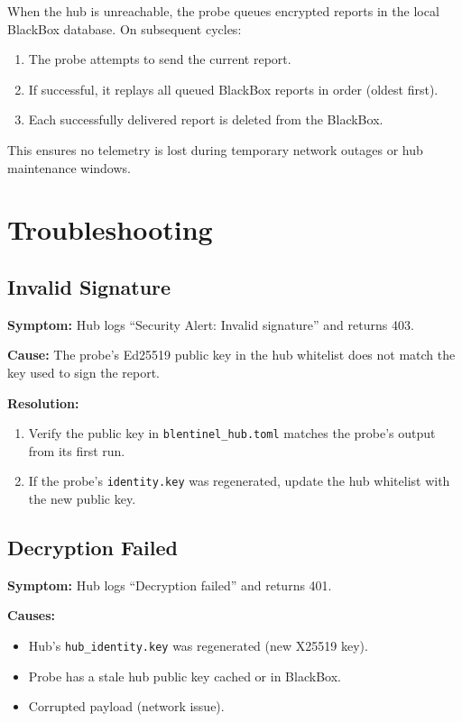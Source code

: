 \documentclass[12pt]{report}
\begin{document}
When the hub is unreachable, the probe queues encrypted reports in the local
BlackBox database. On subsequent cycles:

\begin{enumerate}
    \item The probe attempts to send the current report.
    \item If successful, it replays all queued BlackBox reports in order
          (oldest first).
    \item Each successfully delivered report is deleted from the BlackBox.
\end{enumerate}

This ensures no telemetry is lost during temporary network outages or hub
maintenance windows.

\section{Troubleshooting}

\subsection{Invalid Signature}

\textbf{Symptom:} Hub logs ``Security Alert: Invalid signature'' and returns
403.

\textbf{Cause:} The probe's Ed25519 public key in the hub whitelist does not
match the key used to sign the report.

\textbf{Resolution:}
\begin{enumerate}
    \item Verify the public key in \texttt{blentinel\_hub.toml} matches the
          probe's output from its first run.
    \item If the probe's \texttt{identity.key} was regenerated, update the hub
          whitelist with the new public key.
\end{enumerate}

\subsection{Decryption Failed}

\textbf{Symptom:} Hub logs ``Decryption failed'' and returns 401.

\textbf{Causes:}
\begin{itemize}
    \item Hub's \texttt{hub\_identity.key} was regenerated (new X25519 key).
    \item Probe has a stale hub public key cached or in BlackBox.
    \item Corrupted payload (network issue).
\end{itemize}
\end{document}

